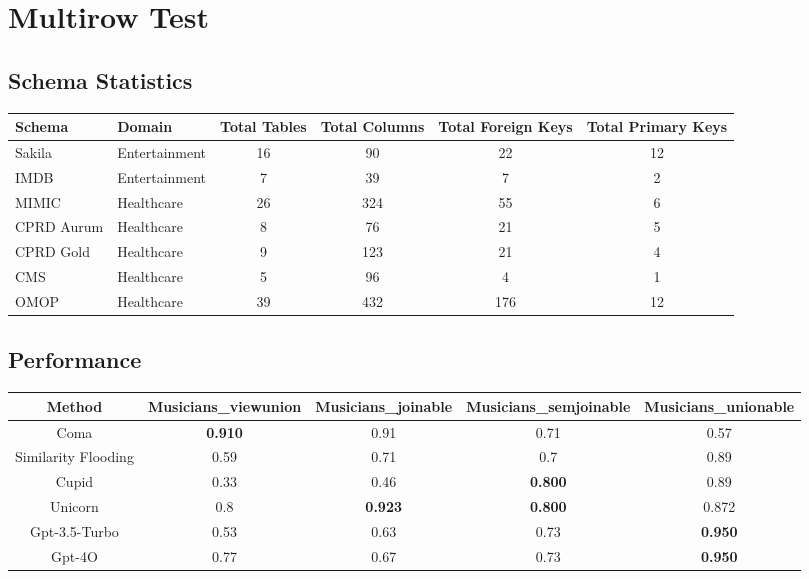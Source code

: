 \documentclass{article}%
\begin{document}
%
\normalsize%
\section{Multirow Test}%
\label{sec:MultirowTest}%
\subsection{Schema Statistics}%
\label{subsec:SchemaStatistics}%
\begin{tabu}{|llcccc|}%
\hline%
Schema&Domain&Total Tables&Total Columns&Total Foreign Keys&Total Primary Keys\\%
\hline%
Sakila&Entertainment&16&90&22&12\\%
\hline%
IMDB&Entertainment&7&39&7&2\\%
\hline%
MIMIC&Healthcare&26&324&55&6\\%
\hline%
CPRD Aurum&Healthcare&8&76&21&5\\%
\hline%
CPRD Gold&Healthcare&9&123&21&4\\%
\hline%
CMS&Healthcare&5&96&4&1\\%
\hline%
OMOP&Healthcare&39&432&176&12\\%
\hline%
\end{tabu}

%
\subsection{Performance}%
\label{subsec:Performance}%
\begin{tabu}{|ccccc|}%
\hline%
Method&Musicians\_viewunion&Musicians\_joinable&Musicians\_semjoinable&Musicians\_unionable\\%
\hline%
{Coma}&\textbf{0.910}&0.91&0.71&0.57\\%
\hline%
{Similarity Flooding}&0.59&0.71&0.7&0.89\\%
\hline%
{Cupid}&0.33&0.46&\textbf{0.800}&0.89\\%
\hline%
{Unicorn}&0.8&\textbf{0.923}&\textbf{0.800}&0.872\\%
\hline%
{Gpt-3.5-Turbo}&0.53&0.63&0.73&\textbf{0.950}\\%
\hline%
{Gpt-4O}&0.77&0.67&0.73&\textbf{0.950}\\%
\hline%
\end{tabu}

%
\end{document}
